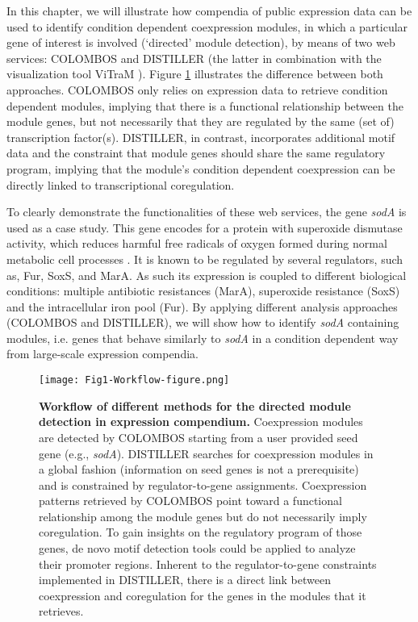 In this chapter, we will illustrate how compendia of public expression 
data can be used to identify condition dependent coexpression modules, in which 
a particular gene of interest is involved (`directed' module detection), by 
means of two web services: COLOMBOS \cite{Engelen2011} and DISTILLER 
\cite{Lemmens2009} (the latter in combination with the visualization tool 
ViTraM \cite{Sun2009}). Figure \ref{fig:workflow-distiller-colombos}
illustrates the difference between both approaches. COLOMBOS only relies on 
expression data to retrieve condition dependent modules, implying that there is 
a functional relationship between the module genes, but not necessarily that 
they are regulated by the same (set of) transcription factor(s). DISTILLER, in 
contrast, incorporates additional motif data and the constraint that module 
genes should share the same regulatory program, implying that the module's 
condition dependent coexpression can be directly linked to transcriptional 
coregulation. 

To clearly demonstrate the functionalities of these web services, 
the gene \textit{sodA} is used as a case study. This gene encodes for a protein 
with superoxide dismutase activity, which reduces harmful free radicals of 
oxygen formed during normal metabolic cell processes \cite{Fawcett1995, 
Tardat1993, Jair1995}. 
It is known to be regulated by several regulators, such as, 
Fur, SoxS, and MarA. As such its expression is coupled to different biological 
conditions: multiple antibiotic resistances (MarA), superoxide resistance 
(SoxS) and the intracellular iron pool (Fur). By applying different analysis 
approaches (COLOMBOS and DISTILLER), we will show how to identify \textit{sodA} 
containing modules, i.e. genes that behave similarly to \textit{sodA} in a 
condition dependent way from large-scale expression compendia.

\begin{figure}[tb]
	\centering
  	\texttt{[image: Fig1-Workflow-figure.png]}
	\caption[Workflow of directed module detection in expression 
	compendium]{
	\textbf{Workflow of different methods for the directed module detection in 
	expression compendium.} 
	Coexpression modules are detected by COLOMBOS starting from a user provided 
	seed gene (e.g., \textit{sodA}). 
	DISTILLER searches for coexpression modules in a global fashion 
	(information on seed genes is not a prerequisite) and is constrained by 
	regulator-to-gene assignments. 
	Coexpression patterns retrieved by COLOMBOS point toward a functional 
	relationship among the module genes but do not necessarily imply 
	coregulation. To gain insights on the regulatory program of those genes, de 
	novo motif detection tools could be applied to analyze their promoter 
	regions. Inherent to the regulator-to-gene constraints implemented in 
	DISTILLER, there is a direct link between coexpression and coregulation for 
	the genes in the modules that it retrieves.}
	\label{fig:workflow-distiller-colombos}
\end{figure}

